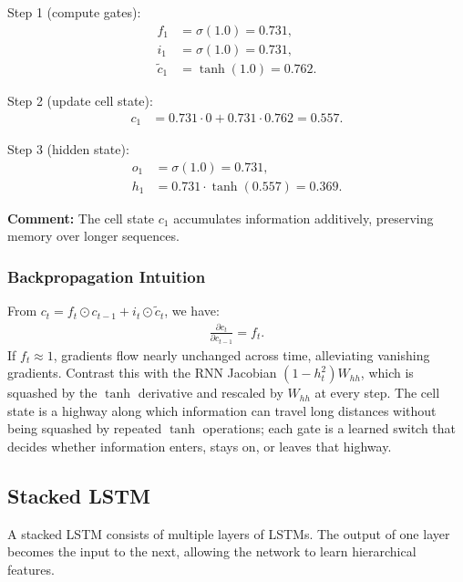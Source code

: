 \documentclass[11pt]{article}
\theoremstyle{remark}
\begin{document}
Step 1 (compute gates):
\begin{align*}
    f_1 &= \sigma(1.0) = 0.731, \\
    i_1 &= \sigma(1.0) = 0.731, \\
    \tilde{c}_1 &= \tanh(1.0) = 0.762.
\end{align*}

Step 2 (update cell state):
\begin{align*}
    c_1 &= 0.731 \cdot 0 + 0.731 \cdot 0.762 = 0.557.
\end{align*}

Step 3 (hidden state):
\begin{align*}
    o_1 &= \sigma(1.0) = 0.731, \\
    h_1 &= 0.731 \cdot \tanh(0.557) = 0.369.
\end{align*}

\noindent \textbf{Comment:} The cell state $c_1$ accumulates information additively, preserving memory over longer sequences.

\subsubsection*{Backpropagation Intuition}
From $c_t = f_t \odot c_{t-1} + i_t \odot \tilde{c}_t$, we have:
\begin{align}
    \frac{\partial c_t}{\partial c_{t-1}} = f_t.
\end{align}
If $f_t \approx 1$, gradients flow nearly unchanged across time, alleviating vanishing gradients. Contrast this with the RNN Jacobian $(1-h_t^2) W_{hh}$, which is squashed by the $\tanh$ derivative and rescaled by $W_{hh}$ at every step. The cell state is a highway along which information can travel long distances without being squashed by repeated $\tanh$ operations; each gate is a learned switch that decides whether information enters, stays on, or leaves that highway.

\subsection{Stacked LSTM}
A stacked LSTM consists of multiple layers of LSTMs. The output of one layer becomes the input to the next, allowing the network to learn hierarchical features.
\end{document}
